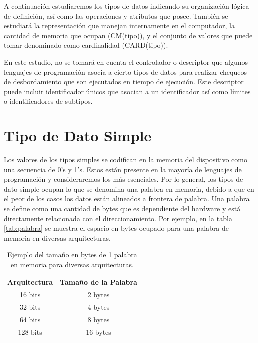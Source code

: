 A continuación estudiaremos los tipos de datos indicando su organización lógica de definición, así como las operaciones y atributos que posee. También se estudiará la representación que manejan internamente en el computador, la cantidad de memoria que ocupan (CM(tipo)), y el conjunto de valores que puede tomar denominado como cardinalidad (CARD(tipo)).

En este estudio, no se tomará en cuenta el controlador o descriptor que algunos lenguajes de programación asocia a cierto tipos de datos para realizar chequeos de desbordamiento que son ejecutados en tiempo de ejecución. Este descriptor puede incluir identificador únicos que asocian a un identificador así como límites o identificadores de subtipos.

\section{Tipo de Dato Simple}

Los valores de los tipos simples se codifican en la memoria del dispositivo como una secuencia de 0's y 1's. Estos están presente en la mayoría de lenguajes de programación y consideraremos los más esenciales. Por lo general, los tipos de dato simple ocupan lo que se denomina una palabra en memoria, debido a que en el peor de los casos los datos están alineados a frontera de palabra. Una palabra se define como una cantidad de bytes que es dependiente del hardware y está directamente relacionada con el direccionamiento. Por ejemplo, en la tabla \ref{tab:palabra} se muestra el espacio en bytes ocupado para una palabra de memoria en diversas arquitecturas.
\begin{center}
\begin{table}[h]
\centering
\begin{tabular}{@{}cc@{}}
\toprule
\multicolumn{1}{l}{Arquitectura} & \multicolumn{1}{l}{Tamaño de la Palabra} \\ \midrule
16 bits                          & 2 bytes                                  \\
32 bits                          & 4 bytes                                  \\
64 bits                          & 8 bytes                                  \\
128 bits                         & 16 bytes                                 \\ \bottomrule
\end{tabular}
\caption{Ejemplo del tamaño en bytes de 1 palabra en memoria para diversas arquitecturas.}
\end{table}
\label{tab:palabra}
\end{center}


